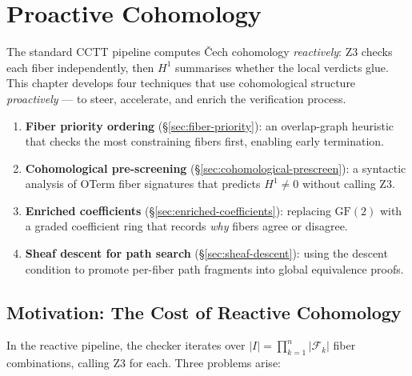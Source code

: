 
\chapter{Proactive Cohomology}
\label{ch:proactive-cohomology}

The standard CCTT pipeline computes \v{C}ech cohomology \emph{reactively}:
Z3 checks each fiber independently, then $H^1$ summarises whether
the local verdicts glue.  This chapter develops four techniques that
use cohomological structure \emph{proactively} --- to steer, accelerate,
and enrich the verification process.

\begin{enumerate}
  \item \textbf{Fiber priority ordering} (\S\ref{sec:fiber-priority}):
    an overlap-graph heuristic that checks the most constraining fibers first,
    enabling early termination.
  \item \textbf{Cohomological pre-screening}
    (\S\ref{sec:cohomological-prescreen}):
    a syntactic analysis of OTerm fiber signatures that predicts
    $H^1 \neq 0$ without calling Z3.
  \item \textbf{Enriched coefficients}
    (\S\ref{sec:enriched-coefficients}):
    replacing $\mathrm{GF}(2)$ with a graded coefficient ring
    that records \emph{why} fibers agree or disagree.
  \item \textbf{Sheaf descent for path search}
    (\S\ref{sec:sheaf-descent}):
    using the descent condition to promote per-fiber path fragments
    into global equivalence proofs.
\end{enumerate}


\section{Motivation: The Cost of Reactive Cohomology}
\label{sec:motivation}

In the reactive pipeline, the checker iterates over
$|I| = \prod_{k=1}^{n} |\mathcal{F}_k|$ fiber combinations,
calling Z3 for each.  Three problems arise:

